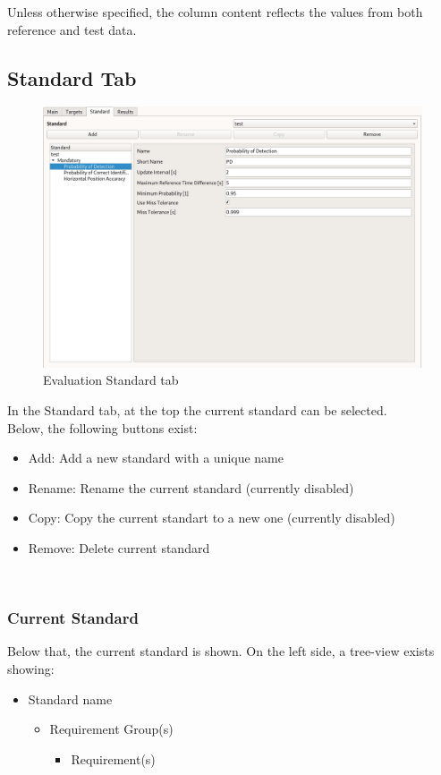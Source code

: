 Unless otherwise specified, the column content reflects the values from both reference and test data.

\subsection{Standard Tab}

\begin{figure}[H]
  \hspace*{-2cm}
    \includegraphics[width=18cm,frame]{../screenshots/eval_standard.png}
  \caption{Evaluation Standard tab}
\end{figure}

In the Standard tab, at the top the current standard can be selected. \\

Below, the following buttons exist:
\begin{itemize}  
\item Add: Add a new standard with a unique name
\item Rename: Rename the current standard (currently disabled)
\item Copy: Copy the current standart to a new one (currently disabled)
\item Remove: Delete current standard
\end{itemize}
\ \\

\subsubsection{Current Standard}

Below that, the current standard is shown. On the left side, a tree-view exists showing:
\begin{itemize}  
\item Standard name
\begin{itemize}  
\item Requirement Group(s)
\begin{itemize}  
\item Requirement(s)
\end{itemize}
\end{itemize}
\end{itemize}
\ \\

